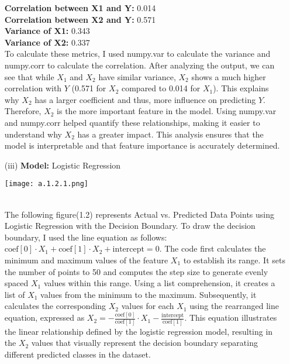 \documentclass{article}
\begin{document}
\begin{enumerate}
\textbf{Correlation between X1 and Y:} 0.014 \\
\textbf{Correlation between X2 and Y:} 0.571 \\
\textbf{Variance of X1:} 0.343 \\
\textbf{Variance of X2:} 0.337 \\

To calculate these metrics, I used numpy.var to calculate the variance and numpy.corr to calculate the correlation. After analyzing the output, we can see that while $X_1$ and $X_2$ have similar variance, $X_2$ shows a much higher correlation with $Y$ (0.571 for $X_2$ compared to 0.014 for $X_1$). This explains why $X_2$ has a larger coefficient and thus, more influence on predicting $Y$. Therefore, $X_2$ is the more important feature in the model. Using numpy.var and numpy.corr helped quantify these relationships, making it easier to understand why $X_2$ has a greater impact. This analysis ensures that the model is interpretable and that feature importance is accurately determined. \\   
    \item[(iii)] 
     \textbf{Model:} Logistic Regression \\

     \begin{center}
        \texttt{[image: a.1.2.1.png]} \\
                \centering
    \end{center} \\
    
    The following figure(1.2) represents Actual vs. Predicted Data Points using Logistic Regression with the Decision Boundary. To draw the decision boundary, I used the line equation as follows: \(\text{coef}[0] \cdot X_1 + \text{coef}[1] \cdot X_2 + \text{intercept} = 0\). The code first calculates the minimum and maximum values of the feature \(X_1\) to establish its range. It sets the number of points to 50 and computes the step size to generate evenly spaced \(X_1\) values within this range. Using a list comprehension, it creates a list of \(X_1\) values from the minimum to the maximum. Subsequently, it calculates the corresponding \(X_2\) values for each \(X_1\) using the rearranged line equation, expressed as \(X_2 = -\frac{\text{coef}[0]}{\text{coef}[1]} \cdot X_1 - \frac{\text{intercept}}{\text{coef}[1]}\). This equation illustrates the linear relationship defined by the logistic regression model, resulting in the \(X_2\) values that visually represent the decision boundary separating different predicted classes in the dataset. \\


\end{enumerate}
\end{document}
